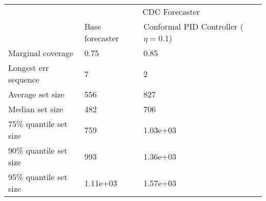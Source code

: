 \begin{tabular}{lll}
\toprule
& \multicolumn{2}{c}{CDC Forecaster} \\
& Base forecaster & Conformal PID Controller ($\eta=0.1$) \\
\midrule
Marginal coverage & 0.75 & 0.85 \\
Longest err sequence & 7 & 2 \\
Average set size & 556 & 827 \\
Median set size & 482 & 706 \\
75\% quantile set size & 759 & 1.03e+03 \\
90\% quantile set size & 993 & 1.36e+03 \\
95\% quantile set size & 1.11e+03 & 1.57e+03 \\
\bottomrule
\end{tabular}
